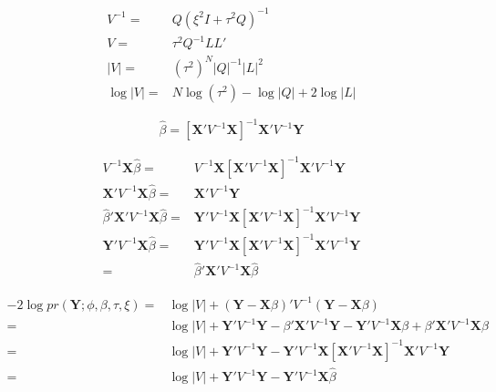 \documentclass[12pt]{article}
\begin{document}
\begin{align*}
V^{-1} =& Q (\xi^2 I + \tau^2 Q)^{-1}\\
V = & \tau^2 Q^{-1} L L'\\
|V| = &(\tau^2)^N |Q|^{-1} |L|^2\\
\log|V| = & N \log(\tau^2) - \log |Q| + 2 \log |L|
\end{align*}

\[
\hat\beta = [ \mathbf{X}'
 V^{-1}   \mathbf{X}]^{-1}
\mathbf{X}'V^{-1} \mathbf{Y}
\]

\begin{align*}
V^{-1} \mathbf{X} \hat\beta =& 
V^{-1} \mathbf{X} [ \mathbf{X}' V^{-1}   \mathbf{X}]^{-1}
\mathbf{X}' V^{-1} \mathbf{Y}\\
\mathbf{X}' V^{-1} \mathbf{X}  \hat\beta= &\mathbf{X}' V^{-1} \mathbf{Y}\\
\hat\beta' \mathbf{X}' V^{-1} \mathbf{X}  \hat\beta = & \mathbf{Y}'  V^{-1}   \mathbf{X}[ \mathbf{X}'
 V^{-1}   \mathbf{X}]^{-1}\mathbf{X}' V^{-1} \mathbf{Y}\\
 \mathbf{Y}' V^{-1} \mathbf{X}  \hat\beta = & \mathbf{Y}'V^{-1} \mathbf{X} [ \mathbf{X}' V^{-1}   \mathbf{X}]^{-1}
\mathbf{X}' V^{-1} \mathbf{Y}\\
= & \hat\beta' \mathbf{X}' V^{-1} \mathbf{X}  \hat\beta
\end{align*}


\begin{align*}
-2 \log pr(\mathbf{Y};\phi,\beta,\tau,\xi) =&
\log| V| + 
( \mathbf{Y} -\mathbf{X}\beta)  '
  V^{-1}
(\mathbf{Y} - \mathbf{X}\beta)\\
=&\log| V| +  \mathbf{Y}' V^{-1} \mathbf{Y} -\beta' \mathbf{X}' V^{-1} \mathbf{Y} - \mathbf{Y}' V^{-1} \mathbf{X}\beta +  \beta'\mathbf{X}'
 V^{-1}   \mathbf{X}\beta
\\
= & \log| V| +
 \mathbf{Y}' V^{-1} \mathbf{Y}  -  \mathbf{Y}'  V^{-1}   \mathbf{X}[ \mathbf{X}'
 V^{-1}   \mathbf{X}]^{-1}\mathbf{X}' V^{-1} \mathbf{Y}\\
= & \log| V| +
 \mathbf{Y}' V^{-1} \mathbf{Y}  -  \mathbf{Y}'  V^{-1}   \mathbf{X}\hat\beta
\end{align*}
\end{document}
